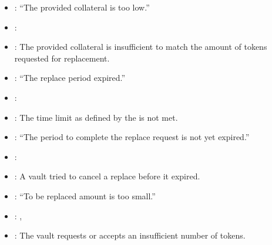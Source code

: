 \documentclass[a4paper,10pt,english]{sphinxmanual}
\begin{document}
\begin{itemize}
\item {} 
: “The provided collateral is too low.”

\item {} 
: {\hyperref[\detokenize{spec/replace:requestreplace}]{}}

\item {} 
: The provided collateral is insufficient to match the amount of tokens requested for replacement.

\end{itemize}

\begin{itemize}
\item {} 
: “The replace period expired.”

\item {} 
: {\hyperref[\detokenize{spec/replace:executereplace}]{}}

\item {} 
: The time limit as defined by the  is not met.

\end{itemize}

\begin{itemize}
\item {} 
: “The period to complete the replace request is not yet expired.”

\item {} 
: {\hyperref[\detokenize{spec/replace:cancelreplace}]{}}

\item {} 
:  A vault tried to cancel a replace before it expired.

\end{itemize}

\begin{itemize}
\item {} 
: “To be replaced amount is too small.”

\item {} 
: {\hyperref[\detokenize{spec/replace:requestreplace}]{}}, {\hyperref[\detokenize{spec/replace:acceptreplace}]{}}

\item {} 
:  The vault requests or accepts an insufficient number of tokens.

\end{itemize}
\end{document}
